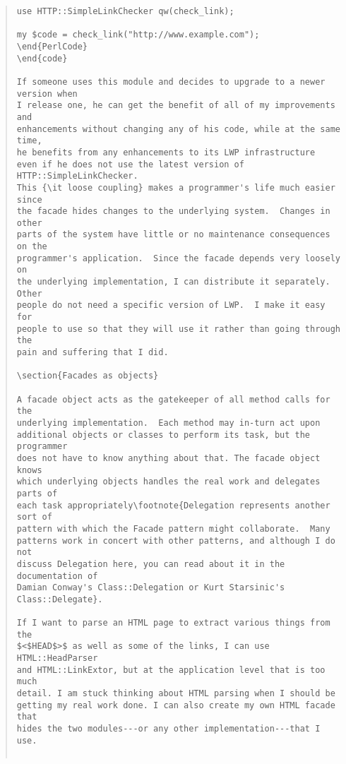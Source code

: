 \begin{quote}
\begin{verbatim}
use HTTP::SimpleLinkChecker qw(check_link);

my $code = check_link("http://www.example.com");
\end{PerlCode}
\end{code}

If someone uses this module and decides to upgrade to a newer version when
I release one, he can get the benefit of all of my improvements and
enhancements without changing any of his code, while at the same time,
he benefits from any enhancements to its LWP infrastructure
even if he does not use the latest version of HTTP::SimpleLinkChecker.
This {\it loose coupling} makes a programmer's life much easier since
the facade hides changes to the underlying system.  Changes in other
parts of the system have little or no maintenance consequences on the
programmer's application.  Since the facade depends very loosely on
the underlying implementation, I can distribute it separately.  Other
people do not need a specific version of LWP.  I make it easy for 
people to use so that they will use it rather than going through the
pain and suffering that I did.

\section{Facades as objects}

A facade object acts as the gatekeeper of all method calls for the
underlying implementation.  Each method may in-turn act upon
additional objects or classes to perform its task, but the programmer
does not have to know anything about that. The facade object knows
which underlying objects handles the real work and delegates parts of
each task appropriately\footnote{Delegation represents another sort of
pattern with which the Facade pattern might collaborate.  Many
patterns work in concert with other patterns, and although I do not
discuss Delegation here, you can read about it in the documentation of
Damian Conway's Class::Delegation or Kurt Starsinic's
Class::Delegate}.

If I want to parse an HTML page to extract various things from the
$<$HEAD$>$ as well as some of the links, I can use HTML::HeadParser
and HTML::LinkExtor, but at the application level that is too much
detail. I am stuck thinking about HTML parsing when I should be
getting my real work done. I can also create my own HTML facade that
hides the two modules---or any other implementation---that I use.


\end{verbatim}
\end{quote}
